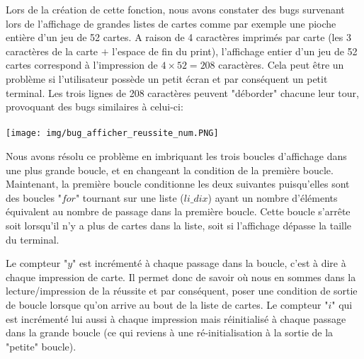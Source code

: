 \documentclass[10pt,a4paper,french,titlepage]{article}
\begin{document}
Lors de la création de cette fonction, nous avons constater des bugs survenant lors de l'affichage de grandes listes de cartes comme par exemple une pioche entière d'un jeu de 52 cartes. A raison de 4 caractères imprimés par carte (les 3 caractères de la carte $+$ l'espace de fin du print), l'affichage entier d'un jeu de 52 cartes correspond à l'impression de $4\times52=208$ caractères. Cela peut être un problème si l'utilisateur possède un petit écran et par conséquent un petit terminal. Les trois lignes de 208 caractères peuvent "déborder" chacune leur tour, provoquant des bugs similaires à  celui-ci:\\\\
\texttt{[image: img/bug\_afficher\_reussite\_num.PNG]}

Nous avons résolu ce problème en imbriquant les trois boucles d'affichage dans une plus grande boucle, et en changeant la condition de la première boucle. Maintenant, la première boucle conditionne les deux suivantes puisqu'elles sont des boucles "$for$" tournant sur une liste ($li\_dix$) ayant un nombre  d'éléments équivalent au nombre de passage dans la première boucle. Cette boucle s'arrête soit lorsqu'il n'y a plus de cartes dans la liste, soit si l'affichage dépasse la taille du terminal. 

Le compteur "$y$" est incrémenté à chaque passage dans la boucle, c'est à dire à chaque impression de carte. Il permet donc de savoir où nous en sommes dans la lecture/impression de la réussite et par conséquent, poser une condition de sortie de boucle lorsque qu'on arrive au bout de la liste de cartes. Le compteur "$i$" qui est incrémenté lui aussi à chaque impression mais réinitialisé à chaque passage dans la grande  boucle (ce qui reviens à une ré-initialisation à la sortie de la "petite" boucle). 
\end{document}
